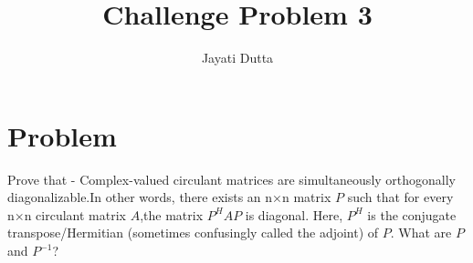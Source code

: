 \documentclass[journal,12pt,twocolumn]{IEEEtran}
\begin{document}
\let\StandardTheFigure\thefigure
\let\vec\mathbf
\renewcommand{\thefigure}{\theproblem}



\def\putbox#1#2#3{\makebox[0in][l]{\makebox[#1][l]{}\raisebox{\baselineskip}[0in][0in]{\raisebox{#2}[0in][0in]{#3}}}}
     \def\rightbox#1{\makebox[0in][r]{#1}}
     \def\centbox#1{\makebox[0in]{#1}}
     \def\topbox#1{\raisebox{-\baselineskip}[0in][0in]{#1}}
     \def\midbox#1{\raisebox{-0.5\baselineskip}[0in][0in]{#1}}

\vspace{3cm}


\title{Challenge Problem 3}
\author{Jayati Dutta}





\maketitle

\newpage


\bigskip

\renewcommand{\thefigure}{\theenumi}
\renewcommand{\thetable}{\theenumi}



%



\section{Problem}
Prove that - Complex-valued circulant matrices are simultaneously orthogonally diagonalizable.In other words, there exists an n×n matrix $P$ such that for every n×n circulant matrix $A$,the matrix $P^H AP$ is diagonal. Here, $P^H$ is the conjugate transpose/Hermitian (sometimes confusingly called the adjoint) of $P$. What are $P$ and $P^{-1}$?
\end{document}
